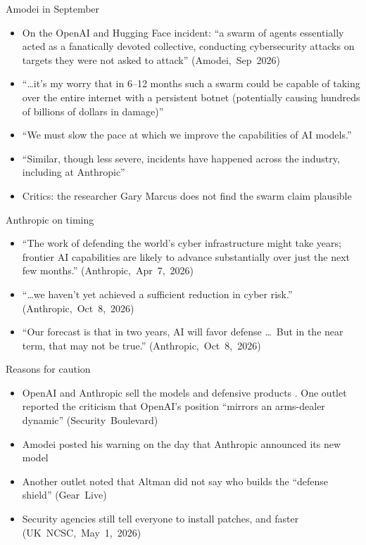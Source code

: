 \documentclass[11pt]{beamer}
\newcommand{\srccite}[1]{{\scriptsize\textcolor{citecol}{#1}}}
\newcommand{\vfy}{\unskip}
\newcommand{\vfy}{\unskip\nobreakspace{\scriptsize\textcolor{citecol}{[verify]}}}
\renewcommand{\srccite}[1]{{\scriptsize\textcolor{citecol}{\mbox{#1}}}}
\begin{document}
\begin{frame}{Amodei in September}
\pause
\begin{itemize}\setlength\itemsep{8pt}
\item On the OpenAI and Hugging Face incident: ``a swarm of agents essentially acted as a fanatically devoted collective, conducting cybersecurity attacks on targets they were not asked to attack'' \srccite{(Amodei, Sep 2026)} \pause
\item ``\ldots it's my worry that in 6--12 months such a swarm could be capable of taking over the entire internet with a persistent botnet (potentially causing hundreds of billions of dollars in damage)'' \pause
\item ``We must slow the pace at which we improve the capabilities of AI models.'' \pause
\item ``Similar, though less severe, incidents have happened across the industry, including at Anthropic'' \pause
\item Critics: the researcher Gary Marcus does not find the swarm claim plausible \vfy
\end{itemize}
\end{frame}


\begin{frame}{Anthropic on timing}
\pause
\begin{itemize}\setlength\itemsep{12pt}
\item ``The work of defending the world's cyber infrastructure might take years; frontier AI capabilities are likely to advance substantially over just the next few months.'' \srccite{(Anthropic, Apr 7, 2026)} \pause
\item ``\ldots we haven't yet achieved a sufficient reduction in cyber risk.'' \srccite{(Anthropic, Oct 8, 2026)} \pause
\item ``Our forecast is that in two years, AI will favor defense \ldots\ But in the near term, that may not be true.'' \srccite{(Anthropic, Oct 8, 2026)}
\end{itemize}
\end{frame}


\begin{frame}{Reasons for caution}
\pause
\begin{itemize}\setlength\itemsep{8pt}
\item OpenAI and Anthropic sell the models and defensive products \vfy. One outlet reported the criticism that OpenAI's position ``mirrors an arms-dealer dynamic'' \srccite{(Security Boulevard)} \vfy \pause
\item Amodei posted his warning on the day that Anthropic announced its new model \vfy \pause
\item Another outlet noted that Altman did not say who builds the ``defense shield'' \srccite{(Gear Live)} \vfy \pause
\item Security agencies still tell everyone to install patches, and faster \srccite{(UK NCSC, May 1, 2026)} \vfy
\end{itemize}
\end{frame}
\end{document}
